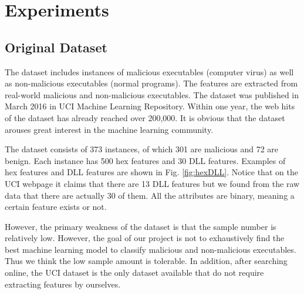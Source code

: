 \documentclass[11pt]{article}
\begin{document}
\section{Experiments}\label{sec:exp}


\subsection{Original Dataset}
The dataset includes instances of malicious executables (computer virus) as well as non-malicious executables (normal programs). The features are extracted from real-world malicious and non-malicious executables. The dataset was published in March 2016 in UCI Machine Learning Repository. Within one year, the web hits of the dataset has already reached over 200,000. It is obvious that the dataset arouses great interest in the machine learning community.

The dataset consists of 373 instances, of which 301 are malicious and 72 are benign. Each instance has 500 hex features and 30 DLL features. Examples of hex features and DLL features are shown in Fig. \ref{fig:hexDLL}. Notice that on the UCI webpage it claims that there are 13 DLL features but we found from the raw data that there are actually 30 of them. All the attributes are binary, meaning a certain feature exists or not. 

However, the primary weakness of the dataset is that the sample number is relatively low. However, the goal of our project is not to exhaustively find the best machine learning model to classify malicious and non-malicious executables. Thus we think the low sample amount is tolerable. In addition, after searching online, the UCI dataset is the only dataset available that do not require extracting features by ourselves.
\end{document}
